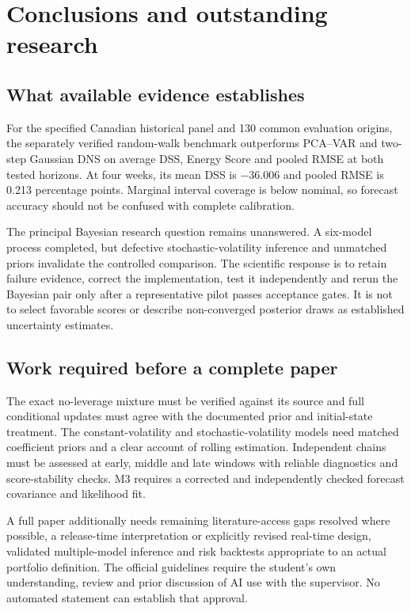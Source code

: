\documentclass[
  12pt,
  letterpaper,
  DIV=11,
  numbers=noendperiod]{scrreprt}
\begin{document}
\chapter{Conclusions and outstanding research}\label{sec-conclusions}

\section{What available evidence
establishes}\label{what-available-evidence-establishes}

For the specified Canadian historical panel and 130 common evaluation
origins, the separately verified random-walk benchmark outperforms
PCA--VAR and two-step Gaussian DNS on average DSS, Energy Score and
pooled RMSE at both tested horizons. At four weeks, its mean DSS is
−36.006 and pooled RMSE is 0.213 percentage points. Marginal interval
coverage is below nominal, so forecast accuracy should not be confused
with complete calibration.

The principal Bayesian research question remains unanswered. A six-model
process completed, but defective stochastic-volatility inference and
unmatched priors invalidate the controlled comparison. The scientific
response is to retain failure evidence, correct the implementation, test
it independently and rerun the Bayesian pair only after a representative
pilot passes acceptance gates. It is not to select favorable scores or
describe non-converged posterior draws as established uncertainty
estimates.

\section{Work required before a complete
paper}\label{work-required-before-a-complete-paper}

The exact no-leverage mixture must be verified against its source and
full conditional updates must agree with the documented prior and
initial-state treatment. The constant-volatility and
stochastic-volatility models need matched coefficient priors and a clear
account of rolling estimation. Independent chains must be assessed at
early, middle and late windows with reliable diagnostics and
score-stability checks. M3 requires a corrected and independently
checked forecast covariance and likelihood fit.

A full paper additionally needs remaining literature-access gaps
resolved where possible, a release-time interpretation or explicitly
revised real-time design, validated multiple-model inference and risk
backtests appropriate to an actual portfolio definition. The official
guidelines require the student's own understanding, review and prior
discussion of AI use with the supervisor. No automated statement can
establish that approval.
\end{document}
